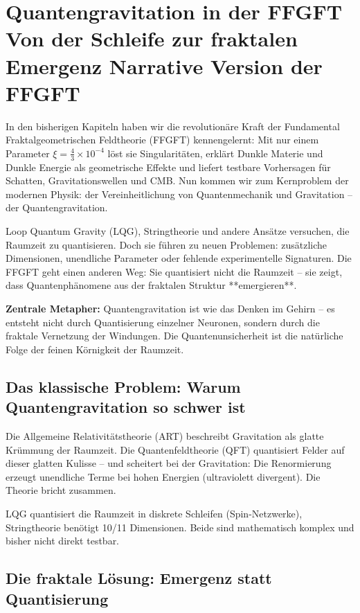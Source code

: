\chapter{Quantengravitation in der FFGFT  Von der Schleife zur fraktalen Emergenz  Narrative Version der FFGFT}


	
	In den bisherigen Kapiteln haben wir die revolutionäre Kraft der Fundamental Fraktalgeometrischen Feldtheorie (FFGFT) kennengelernt: Mit nur einem Parameter \(\xi = \frac{4}{3} \times 10^{-4}\) löst sie Singularitäten, erklärt Dunkle Materie und Dunkle Energie als geometrische Effekte und liefert testbare Vorhersagen für Schatten, Gravitationswellen und CMB. Nun kommen wir zum Kernproblem der modernen Physik: der Vereinheitlichung von Quantenmechanik und Gravitation – der Quantengravitation.
	
	Loop Quantum Gravity (LQG), Stringtheorie und andere Ansätze versuchen, die Raumzeit zu quantisieren. Doch sie führen zu neuen Problemen: zusätzliche Dimensionen, unendliche Parameter oder fehlende experimentelle Signaturen. Die FFGFT geht einen anderen Weg: Sie quantisiert nicht die Raumzeit – sie zeigt, dass Quantenphänomene aus der fraktalen Struktur **emergieren**.
	
	\textbf{Zentrale Metapher:} Quantengravitation ist wie das Denken im Gehirn – es entsteht nicht durch Quantisierung einzelner Neuronen, sondern durch die fraktale Vernetzung der Windungen. Die Quantenunsicherheit ist die natürliche Folge der feinen Körnigkeit der Raumzeit.
	
	\section{Das klassische Problem: Warum Quantengravitation so schwer ist}
	
	Die Allgemeine Relativitätstheorie (ART) beschreibt Gravitation als glatte Krümmung der Raumzeit. Die Quantenfeldtheorie (QFT) quantisiert Felder auf dieser glatten Kulisse – und scheitert bei der Gravitation: Die Renormierung erzeugt unendliche Terme bei hohen Energien (ultraviolett divergent). Die Theorie bricht zusammen.
	
	LQG quantisiert die Raumzeit in diskrete Schleifen (Spin-Netzwerke), Stringtheorie benötigt 10/11 Dimensionen. Beide sind mathematisch komplex und bisher nicht direkt testbar.
	
	\section{Die fraktale Lösung: Emergenz statt Quantisierung}
	

